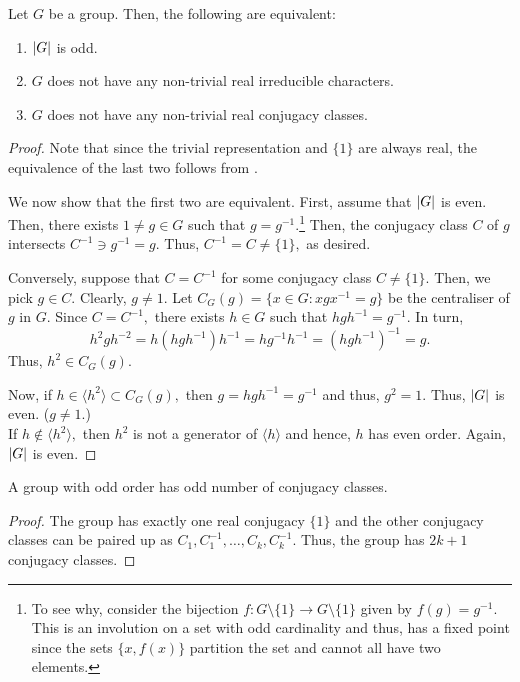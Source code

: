 \begin{prop} \label{prop:oddgroupconjclassesreal}
	Let $G$ be a group. Then, the following are equivalent:
	\begin{enumerate}
	 	\item ${\left\lvert G \right\lvert}$ is odd.
	 	\item $G$ does not have any non-trivial real irreducible characters.
	 	\item $G$ does not have any non-trivial real conjugacy classes.
	 \end{enumerate} 
\end{prop}

\begin{proof} 
	Note that since the trivial representation and $\{1\}$ are always real, the equivalence of the last two follows from .

	We now show that the first two are equivalent. First, assume that ${\left\lvert G \right\lvert}$ is even. Then, there exists $1 \neq g \in G$ such that $g = g^{-1}.$\footnote{To see why, consider the bijection $f : G\setminus\{1\} \to G\setminus\{1\}$ given by $f(g) = g^{-1}.$ This is an involution on a set with odd cardinality and thus, has a fixed point since the sets $\{x, f(x)\}$ partition the set and cannot all have two elements. } Then, the conjugacy class $C$ of $g$ intersects $C^{-1} \ni g^{-1} = g.$ Thus, $C^{-1} = C \neq \{1\},$ as desired.

	Conversely, suppose that $C = C^{-1}$ for some conjugacy class $C \neq \{1\}.$ Then, we pick $g \in C.$ Clearly, $g \neq 1.$ Let $C_G(g) = \{x \in G : xgx^{-1}= g\}$ be the centraliser of $g$ in $G.$ Since $C = C^{-1},$ there exists $h \in G$ such that $hgh^{-1} = g^{-1}.$ In turn,
	\begin{equation*} 
		h^2gh^{-2} = h(hgh^{-1})h^{-1} = hg^{-1}h^{-1} = (hgh^{-1})^{-1} = g.
	\end{equation*}
	Thus, $h^2 \in C_G(g).$

	Now, if $h \in \langle h^2\rangle \subset C_G(g),$ then $g = hgh^{-1} = g^{-1}$ and thus, $g^2 = 1.$ Thus, ${\left\lvert G \right\lvert}$ is even. ($g \neq 1.$)\\
	If $h \notin \langle h^2\rangle,$ then $h^2$ is not a generator of $\langle h\rangle$ and hence, $h$ has even order. Again, ${\left\lvert G \right\lvert}$ is even.
\end{proof}

\begin{cor}
	A group with odd order has odd number of conjugacy classes.
\end{cor}
\begin{proof} 
	The group has exactly one real conjugacy $\{1\}$ and the other conjugacy classes can be paired up as $C_1, C_1^{-1}, \ldots, C_k, C_k^{-1}.$ Thus, the group has $2k + 1$ conjugacy classes.
\end{proof}

